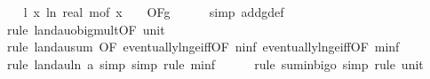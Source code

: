 \begin{isabellebody}
\isanewline
\ \ \isamarkupfalse%
\ l{}{\isacharcolon}{\kern0pt}\ {\isachardoublequoteopen}{\isacharparenleft}{\kern0pt}{\isasymlambda}x{\isachardot}{\kern0pt}\ ln\ {\isacharparenleft}{\kern0pt}real\ {\isacharparenleft}{\kern0pt}m{\isacharunderscore}{\kern0pt}of\ x{\isacharparenright}{\kern0pt}\ {\isacharplus}{\kern0pt}\ {}{\isacharparenright}{\kern0pt}{\isacharparenright}{\kern0pt}\ {\isasymin}\ O{\isacharbrackleft}{\kern0pt}{\isacharquery}{\kern0pt}F{\isacharbrackright}{\kern0pt}{\isacharparenleft}{\kern0pt}g{\isacharparenright}{\kern0pt}{\isachardoublequoteclose}\isanewline
\ \ \ \ \isamarkupfalse%
\ {\isacharparenleft}{\kern0pt}simp\ add{\isacharcolon}{\kern0pt}g{\isacharunderscore}{\kern0pt}def{\isacharparenright}{\kern0pt}\isanewline
\ \ \ \ \isamarkupfalse%
\ {\isacharparenleft}{\kern0pt}rule\ landau{\isacharunderscore}{\kern0pt}o{\isachardot}{\kern0pt}big{\isacharunderscore}{\kern0pt}mult{\isacharunderscore}{\kern0pt}{}{\isacharprime}{\kern0pt}{\isacharbrackleft}{\kern0pt}OF\ unit{\isacharunderscore}{\kern0pt}{}{\isacharbrackright}{\kern0pt}{\isacharparenright}{\kern0pt}\isanewline
\ \ \ \ \isamarkupfalse%
\ {\isacharparenleft}{\kern0pt}rule\ landau{\isacharunderscore}{\kern0pt}sum{\isacharunderscore}{\kern0pt}{}\ {\isacharbrackleft}{\kern0pt}OF\ eventually{\isacharunderscore}{\kern0pt}ln{\isacharunderscore}{\kern0pt}ge{\isacharunderscore}{\kern0pt}iff{\isacharbrackleft}{\kern0pt}OF\ n{\isacharunderscore}{\kern0pt}inf{\isacharbrackright}{\kern0pt}\ eventually{\isacharunderscore}{\kern0pt}ln{\isacharunderscore}{\kern0pt}ge{\isacharunderscore}{\kern0pt}iff{\isacharbrackleft}{\kern0pt}OF\ m{\isacharunderscore}{\kern0pt}inf{\isacharbrackright}{\kern0pt}{\isacharbrackright}{\kern0pt}{\isacharparenright}{\kern0pt}\isanewline
\ \ \ \ \isamarkupfalse%
\ {\isacharparenleft}{\kern0pt}rule\ landau{\isacharunderscore}{\kern0pt}ln{\isacharunderscore}{\kern0pt}{}{\isacharbrackleft}{\kern0pt}\ a{\isacharequal}{\kern0pt}{\isachardoublequoteopen}{}{\isachardoublequoteclose}{\isacharbrackright}{\kern0pt}{\isacharcomma}{\kern0pt}\ simp{\isacharcomma}{\kern0pt}\ simp{\isacharcomma}{\kern0pt}\ rule\ m{\isacharunderscore}{\kern0pt}inf{\isacharparenright}{\kern0pt}\isanewline
\ \ \ \ \isamarkupfalse%
\ {\isacharparenleft}{\kern0pt}rule\ sum{\isacharunderscore}{\kern0pt}in{\isacharunderscore}{\kern0pt}bigo{\isacharcomma}{\kern0pt}\ simp{\isacharcomma}{\kern0pt}\ rule\ unit{\isacharunderscore}{\kern0pt}{}{\isacharparenright}{\kern0pt}\isanewline

\end{isabellebody}
